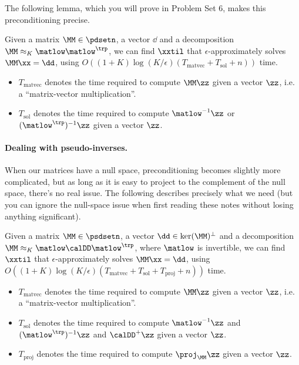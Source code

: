 The following lemma, which you will prove in Problem Set 6, makes this
preconditioning precise.
\begin{lemma}
  \label{lem:cholprecond}
  Given a matrix $\MM \in \pdsetn$, a vector $\dd$ and a decomposition $\MM
  \approx_{K} \matlow\matlow^{\trp}$,
  we can find $\xxtil$ that $\epsilon$-approximately solves $\MM \xx =
  \dd$, using
$O( (1+ K)\log(K/\epsilon)(T_{\text{matvec}} + T_{\text{sol}} + n) ) $ time.
\begin{itemize}
\item $T_{\text{matvec}}$ denotes the time required to compute $\MM
  \zz$ given a vector $\zz$, i.e.  a ``matrix-vector multiplication''.
\item  $T_{\text{sol}}$ denotes the time required to compute
  $\matlow^{-1}\zz$ or $(\matlow^{\trp})^{-1}\zz$ given a vector
  $\zz$.
\end{itemize}
\end{lemma}
\paragraph{Dealing with pseudo-inverses.}
When our matrices have a null space, preconditioning becomes slightly
more complicated, but as long as it is easy to project to the
complement of the null space, there's no real issue. The following
describes precisely what we need (but you can ignore the null-space
issue when first reading these notes without losing anything
significant).
\begin{lemma}
  \label{lem:cholprecondpinv}
  Given a matrix $\MM \in \psdsetn$, a vector $\dd \in \ker(\MM)^{\perp}$ and a decomposition $\MM
  \approx_{K} \matlow\calDD\matlow^{\trp}$, where $\matlow$ is invertible,
  we can find $\xxtil$ that $\epsilon$-approximately solves $\MM \xx =
  \dd$, using
${O( (1+ K)\log(K/\epsilon)(T_{\text{matvec}} + T_{\text{sol}} +
T_{\text{proj}} + n) ) }$ time.
\begin{itemize}
\item $T_{\text{matvec}}$ denotes the time required to compute $\MM
  \zz$ given a vector $\zz$, i.e.  a ``matrix-vector multiplication''.
\item  $T_{\text{sol}}$ denotes the time required to compute
  $\matlow^{-1}\zz$ and $(\matlow^{\trp})^{-1}\zz$ and $\calDD^{+}\zz$ given a vector
  $\zz$.
\item $T_{\text{proj}}$ denotes the time required to compute
  $\proj_{\MM} \zz$ given a vector $\zz$.
\end{itemize}
\end{lemma}

